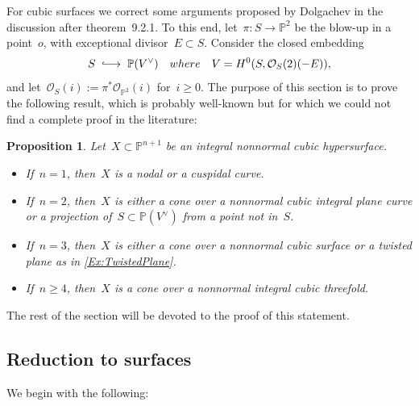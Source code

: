 \documentclass[a4paper]{amsart}
\newcommand{\bbP}{\mathbb{P}}
\newcommand{\cO}{\mathcal{O}}
\newcommand{\rH}{\textup{H}}
\newcommand{\intoo}{\lhook\joinrel\longrightarrow}
\renewcommand{\ge}{\geqslant}
\theoremstyle{plain}
\newtheorem{proposition}[theorem]{Proposition}
\theoremstyle{definition}
\numberwithin{equation}{section}
\begin{document}
For cubic surfaces we correct some arguments proposed by Dolgachev \cite{Dol12} in the discussion  after theorem~9.2.1. To this end, let~$\pi \colon S \to \bbP^2$ be the blow-up in a point~$o$, with exceptional divisor~$E \subset S$. Consider the closed embedding
\[ S \; \intoo \; \bbP(V^\vee) \quad \textup{where} \quad V = \rH^0(S, \cO_S(2)(-E)),\]
and let~$\cO_{S}(i) := \pi^\ast \cO_{\bbP^2}(i)$ for~$i \ge 0$. The purpose of this section is to prove the following result, which is probably well-known but for which we could not find a complete proof in the literature:

\begin{proposition} \label{Prop:NonNormalCubicHypersurfaces} Let~$X \subset \bbP^{n+1}$ be an integral nonnormal cubic hypersurface.

\begin{itemize}
\item If~$n = 1$, then~$X$ is a nodal or a cuspidal curve. \smallskip
\item If~$n = 2$, then~$X$ is either a cone over a nonnormal cubic integral plane curve or a projection of~$S \subset \bbP(V^\vee)$ from a point not in~$S$. \smallskip
\item If~$n = 3$, then~$X$ is either a cone over a nonnormal cubic surface or a twisted plane as in \cref{Ex:TwistedPlane}. \smallskip
\item If~$n \ge 4$, then~$X$ is a cone over a nonnormal integral cubic threefold.
\end{itemize}
\end{proposition}

\noindent
The rest of the section will be devoted to the proof of this statement. 


\subsection{Reduction to surfaces}
We begin with the following:
\end{document}
